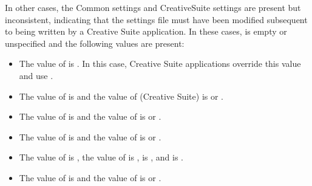 \documentclass[letterpaper,12pt,english,openany,oneside]{sphinxmanual}
\begin{document}
In other cases, the Common settings and CreativeSuite settings are present but inconsistent, indicating that the settings file must have been modified subsequent to being written by a Creative Suite application. In these cases,  is empty or unspecified and the following values are present:
\begin{itemize}
\item {} 
The value of  is  . In this case, Creative Suite applications override this value and use  .

\item {} 
The value of  is  and the value of  (Creative Suite) is  or  .

\item {} 
The value of  is  and the value of  is  or  .

\item {} 
The value of  is  and the value of  is  or  .

\item {} 
The value of  is  , the value of  is  ,  is  , and  is  .

\item {} 
The value of  is  and the value of  is  or  .


\end{itemize}
\end{document}

